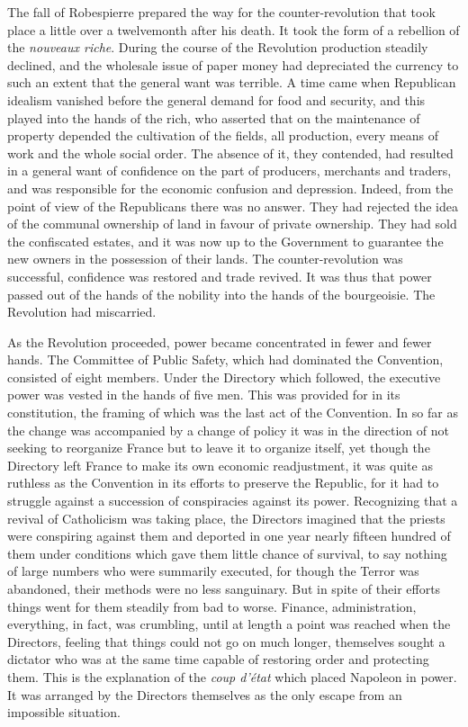 \documentclass{book}
\begin{document}
The fall of Robespierre prepared the way for the counter-revolution that took place a little over a twelvemonth after his death. It took the form of a rebellion of the \emph{nouveaux riche}. During the course of the Revolution production steadily declined, and the wholesale issue of paper money had depreciated the currency to such an extent that the general want was terrible. A time came when Republican idealism vanished before the general demand for food and security, and this played into the hands of the rich, who asserted that on the maintenance of property depended the cultivation of the fields, all production, every means of work and the whole social order. The absence of it, they contended, had resulted in a general want of confidence on the part of producers, merchants and traders, and was responsible for the economic confusion and depression. Indeed, from the point of view of the Republicans there was no answer. They had rejected the idea of the communal ownership of land in favour of private ownership. They had sold the confiscated estates, and it was now up to the Government to guarantee the new owners in the possession of their lands. The counter-revolution was successful, confidence was restored and trade revived. It was thus that power passed out of the hands of the nobility into the hands of the bourgeoisie. The Revolution had miscarried.

As the Revolution proceeded, power became concentrated in fewer and fewer hands. The Committee of Public Safety, which had dominated the Convention, consisted of eight members. Under the Directory which followed, the executive power was vested in the hands of five men. This was provided for in its constitution, the framing of which was the last act of the Convention. In so far as the change was accompanied by a change of policy it was in the direction of not seeking to reorganize France but to leave it to organize itself, yet though the Directory left France to make its own economic readjustment, it was quite as ruthless as the Convention in its efforts to preserve the Republic, for it had to struggle against a succession of conspiracies against its power. Recognizing that a revival of Catholicism was taking place, the Directors imagined that the priests were conspiring against them and deported in one year nearly fifteen hundred of them under conditions which gave them little chance of survival, to say nothing of large numbers who were summarily executed, for though the Terror was abandoned, their methods were no less sanguinary. But in spite of their efforts things went for them steadily from bad to worse. Finance, administration, everything, in fact, was crumbling, until at length a point was reached when the Directors, feeling that things could not go on much longer, themselves sought a dictator who was at the same time capable of restoring order and protecting them. This is the explanation of the \emph{coup d’état} which placed Napoleon in power. It was arranged by the Directors themselves as the only escape from an impossible situation.
\end{document}

